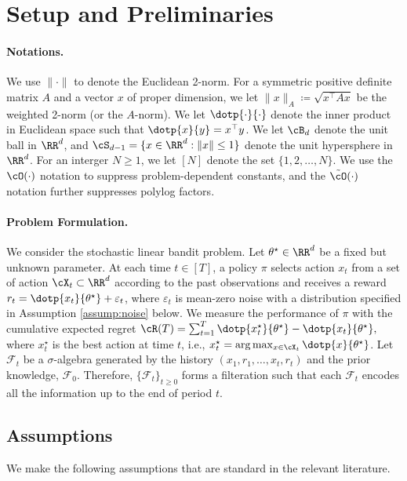 \section{Setup and Preliminaries}\label{sec:setting}

\paragraph{Notations.} We use $\|\cdot\|$ to denote the Euclidean 2-norm. For a symmetric positive definite matrix $A$ and a vector $x$ of proper dimension, we let $\|x\|_{A}\coloneqq \sqrt{x^\top A x}$ be the weighted 2-norm (or the $A$-norm). We let $\dotp{\cdot}{\cdot}$ denote the inner product in Euclidean  space such that $\dotp{x}{y} = x^\top y$. We let $\cB_d $ denote the unit ball in $\RR^d$, and $\cS_{d-1} = \{x\in\RR^d:\|x\| \leq  1\}$ denote the unit hypersphere in  $\RR^d$. For an interger $N\geq 1$, we let $[N]$ denote the set $\{1,2,\dots,N\}$. We use the $\cO(\cdot	)$ notation to suppress problem-dependent constants, and the $\tilde{\cO}(\cdot)$ notation further suppresses polylog factors.

\paragraph{Problem Formulation.} We consider the stochastic linear bandit problem. Let $\theta^\star \in \RR^d$ be a fixed but unknown parameter. At each time $t\in[T]$, a policy $\pi$  selects action $x_t$ from a set of action  $\cX_t \subset \RR^d $ according to the past observations and receives a reward $r_t  = \dotp{x_t}{\theta^\star} + \varepsilon_t$, where $ \varepsilon_t$ is mean-zero noise with a distribution specified in Assumption \ref{assump:noise} below. We measure the performance of $\pi$ with the cumulative expected regret 
%
$\cR(T) = \sum_{t= 1}^T\dotp{x^{\star}_t}{\theta^\star} -  \dotp{x_t}{\theta^\star},$
%
where $x^{\star}_t$ is the best action at time $t$, i.e., $x^{\star}_t=\arg\max_{x \in \cX_t}\dotp{x}{\theta^\star}$.
Let $\mathcal{F}_t$ be a $\sigma$-algebra generated by the history $(x_1, r_1, \ldots, x_t, r_t)$ and the prior knowledge, $\mathcal{F}_0$. Therefore, $\{\mathcal{F}_t\}_{t\ge 0}$ forms a filteration such that each $\mathcal{F}_t$ encodes all the information up to the end of period $t$.



\subsection{Assumptions}
We make the following assumptions that are standard in the relevant literature.

